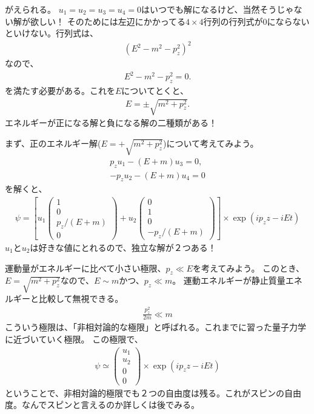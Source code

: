 \documentclass[10pt,a4paper]{jarticle}
\begin{document}
がえられる。
%
$u_1 = u_2 = u_3 = u_4 = 0$はいつでも解になるけど、当然そうじゃない解が欲しい！
そのためには左辺にかかってる$4 \times 4$行列の行列式が$0$にならないといけない。行列式は、
\begin{align}
(E^2-m^2-p_z^2)^2
\end{align}
なので、
\begin{align}
E^2-m^2-p_z^2 = 0.
\end{align}
を満たす必要がある。これを$E$についてとくと、
\begin{align}
E = \pm \sqrt{m^2 + p_z^2}.
\end{align}
エネルギーが正になる解と負になる解の二種類がある！

まず、正のエネルギー解($E = + \sqrt{m^2+p_z^2}$)について考えてみよう。
\begin{align}
p_z u_1 - (E+m) u_3 = 0, \\
-p_z u_2 - (E+m) u_4 = 0
\end{align}
を解くと、
\begin{align}
\psi =
\left[ u_1 \left(\begin{array}{cc}
1 \\ 0 \\ p_z/(E+m) \\ 0
\end{array}\right)
+
u_2 \left(\begin{array}{cc}
0 \\ 1 \\ 0 \\ -p_z/(E+m)
\end{array}\right) \right] \times \exp(ip_z z - i Et)
\end{align}
$u_1$と$u_2$は好きな値にとれるので、独立な解が２つある！

運動量がエネルギーに比べて小さい極限、$p_z \ll E$を考えてみよう。
このとき、$E = \sqrt{m^2 + p_z^2}$なので、$E \sim m$かつ、$p_z \ll m$。
運動エネルギーが静止質量エネルギーと比較して無視できる。
\begin{align}
\frac{p_z^2}{2m} \ll m
\end{align}
こういう極限は、「非相対論的な極限」と呼ばれる。これまでに習った量子力学に近づいていく極限。
この極限で、
\begin{align}
\psi \simeq
\left(\begin{array}{cc}
u_1 \\ u_2 \\ 0 \\ 0
\end{array}\right)
 \times \exp(ip_z z - i Et)
\end{align}
ということで、非相対論的極限でも２つの自由度は残る。これがスピンの自由度。なんでスピンと言えるのか詳しくは後でみる。
\end{document}
